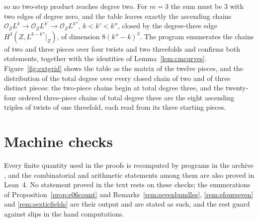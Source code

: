 \documentclass[11pt,reqno]{amsart}
\numberwithin{equation}{section}
\theoremstyle{plain}
\theoremstyle{definition}
\begin{document}
so no two-step product reaches degree two. For $m=3$ the sum must be $3$ with two edges of degree zero, and the table leaves exactly the ascending chains $\mathcal{O}_{Z}L^{k}\to\mathcal{O}_{Z}L^{k'}\to\mathcal{O}_{Z}L^{k''}$, $k<k'<k''$, closed by the degree-three edge $H^{3}(Z,L^{k-k''}|_{Z})$, of dimension $8(k''-k)^{3}$. The program  enumerates the chains of two and three pieces over four twists and two threefolds and confirms both statements, together with the identities of Lemma~\ref{lem:cmcurves}. Figure~\ref{fig:extgrid} shows the table as the matrix of the twelve pieces, and the distribution of the total degree over every closed chain of two and of three distinct pieces: the two-piece chains begin at total degree three, and the twenty-four ordered three-piece chains of total degree three are the eight ascending triples of twists of one threefold, each read from its three starting pieces.

\section{Machine checks}\label{app:checks}

Every finite quantity used in the proofs is recomputed by programs in the archive \cite{BB26code}, and the combinatorial and arithmetic statements among them are also proved in Lean~4. No statement proved in the text rests on these checks; the enumerations of Proposition~\ref{prop:e06count} and Remarks~\ref{rem:sevenbundles}, \ref{rem:efourseven} and \ref{rem:sexticfields} are their output and are stated as such, and the rest guard against slips in the hand computations.
\end{document}
